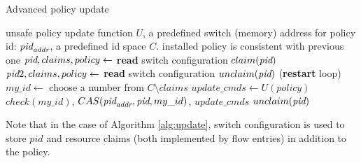 \documentclass[conference]{sigcomm-alternate}
\newcommand{\claimcheck}{check\xspace}
\newcommand{\addr}{\emph{addr}\xspace}
\newcommand{\pid}{\emph{pid}\xspace}
\newcommand{\ufunc}{U} %
\begin{document}
\begin{algorithm}[h]
    \caption{Advanced policy update}
    \label{alg:update}
    \begin{algorithmic}[1]
        \Require unsafe policy update function $\ufunc$, a predefined switch (memory) address for policy id: $\pid_{\addr}$, a predefined id space $C$.
    \Ensure installed policy is consistent with previous one
 		\Repeat
		 	\State $\pid,claims,policy\gets$ \textbf{read} switch configuration
 			\State $claim(\pid)$
 			\State $\pid 2,claims,policy\gets$ \textbf{read} switch configuration
 			\If {$\pid\neq \pid 2$}
	 			\State $unclaim(\pid)$
 				 (\textbf{restart} loop)
 			\EndIf
 			\State $my\_id\gets$ choose a number from $C\setminus claims$
 			\State $update\_cmds\gets \ufunc(policy)$
 			\startTxn
 				\State $\claimcheck(my\_id)$,
	 			\State $CAS(\pid_{\addr}, \pid,my\_id)$,
	 			\State $update\_cmds$ %
 			\endTxn
	 		\State $unclaim(\pid)$
			\Return

    \end{algorithmic}
\end{algorithm}

Note that in the case of Algorithm \ref{alg:update}, switch configuration is used to store $pid$ and resource claims (both implemented by flow entries) in addition to the policy.


%
%
%
\end{document}
